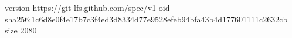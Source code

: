 version https://git-lfs.github.com/spec/v1
oid sha256:1c6d8e0f4e17b7c3f4ed3d8334d77e9528efeb94bfa43b4d177601111c2632cb
size 2080
